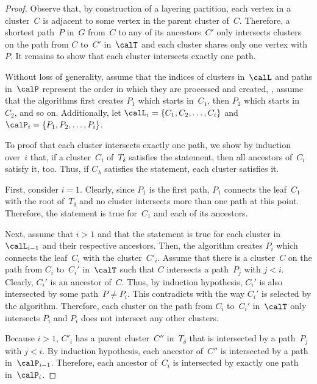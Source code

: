 \begin{proof}
Observe that, by construction of a layering partition, each vertex in a cluster~$C$ is adjacent to some vertex in the parent cluster of~$C$.
Therefore, a shortest path~$P$ in~$G$ from~$C$ to any of its ancestors~$C'$ only intersects clusters on the path from $C$ to~$C'$ in~$\calT$ and each cluster shares only one vertex with~$P$.
It remains to show that each cluster intersects exactly one path.

Without loss of generality, assume that the indices of clusters in~$\calL$ and paths in~$\calP$ represent the order in which they are processed and created, \ie, assume that the algorithms first creates $P_1$ which starts in~$C_1$, then $P_2$ which starts in~$C_2$, and so on.
Additionally, let $\calL_i = \{ C_1, C_2, \ldots, C_i \}$ and $\calP_i = \{ P_1, P_2, \ldots, P_i \}$.

To proof that each cluster intersects exactly one path, we show by induction over~$i$ that, if a cluster~$C_i$ of~$T_\delta$ satisfies the statement, then all ancestors of~$C_i$ satisfy it, too.
Thus, if $C_\lambda$ satisfies the statement, each cluster satisfies it.

First, consider $i = 1$.
Clearly, since $P_1$ is the first path, $P_1$ connects the leaf~$C_1$ with the root of~$T_\delta$ and no cluster intersects more than one path at this point.
Therefore, the statement is true for~$C_1$ and each of its ancestors.

Next, assume that $i > 1$ and that the statement is true for each cluster in~$\calL_{i - 1}$ and their respective ancestors.
Then, the algorithm creates $P_i$ which connects the leaf~$C_i$ with the cluster~$C'_i$.
Assume that there is a cluster~$C$ on the path from $C_i$ to~$C_i'$ in~$\calT$ such that $C$ intersects a path~$P_j$ with $j < i$.
Clearly, $C_i'$ is an ancestor of~$C$.
Thus, by induction hypothesis, $C_i'$ is also intersected by some path~$P \neq P_i$.
This contradicts with the way $C_i'$ is selected by the algorithm.
Therefore, each cluster on the path from $C_i$ to~$C_i'$ in~$\calT$ only intersects $P_i$ and $P_i$ does not intersect any other clusters.

Because $i > 1$, $C'_i$ has a parent cluster~$C''$ in~$T_\delta$ that is intersected by a path~$P_j$ with $j < i$.
By induction hypothesis, each ancestor of~$C''$ is intersected by a path in~$\calP_{i - 1}$.
Therefore, each ancestor of~$C_i$ is intersected by exactly one path in~$\calP_i$.
\end{proof}


